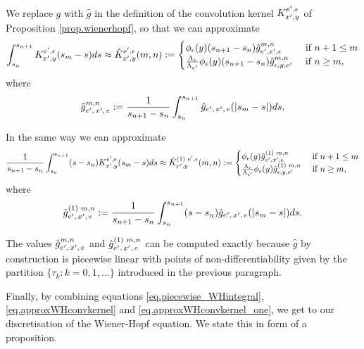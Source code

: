 \documentclass[10pt, article,table]{article}
\begin{document}
We replace $g$ with $\hat{g}$ in the definition of the convolution kernel $K_{x^{\prime},y}^{e^{\prime},\epsilon}$ of Proposition \ref{prop.wienerhopf}, so that we can approximate 
\begin{equation}\label{eq.approxWHconvkernel}
 \int_{s_{n}}^{s_{n+1}} K_{x^{\prime},y}^{e^{\prime},\epsilon} (s_m -s )ds
 \approx
 \hat{K}_{x^{\prime},y}^{e^{\prime},\epsilon}(m,n) 
 :=
 \begin{cases}
  \phi_{\epsilon} (y) (s_{n+1}-s_n) \hat{g}_{e^{\prime},x^{\prime},\epsilon}^{m,n} & \text{ if } n+1\leq m
  \\
  \frac{\Lambda_\epsilon}{\Lambda_{e^{\prime}}} \phi_{\epsilon} (y) (s_{n+1}-s_n) \hat{g}_{\epsilon,y,e^{\prime}}^{m,n} & \text{ if } n\geq m , 
 \end{cases}
\end{equation}
where 
\begin{equation*}
 \hat{g}_{e^{\prime},\, x^{\prime},\, e}^{m,n} := \frac{1}{s_{n+1}-s_{n}}\int_{s_n}^{s_{n+1}} \hat{g}_{e^{\prime},\, x^{\prime},\, e} (\left\lvert {s_m -s} \right\rvert)ds.
\end{equation*}

In the same way we can approximate
\begin{equation}\label{eq.approxWHconvkernel_one}
 \frac{1}{s_{n+1}-s_{n}}\int_{s_{n}}^{s_{n+1}} (s-s_n)K_{x^{\prime},y}^{e^{\prime},\epsilon} (s_m -s )ds
 \approx
 \hat{K}_{x^{\prime},y}^{(1) \, \, e^{\prime},\epsilon}(m,n) 
 :=
 \begin{cases}
  \phi_{\epsilon} (y) \hat{g}_{e^{\prime},x^{\prime},\epsilon}^{(1) \, \, m,n} & \text{ if } n+1\leq m
  \\
  \frac{\Lambda_\epsilon}{\Lambda_{e^{\prime}}} \phi_{\epsilon} (y) \hat{g}_{\epsilon,y,e^{\prime}}^{(1) \, \, m,n} & \text{ if } n\geq m , 
 \end{cases}
\end{equation}
where 
\begin{equation*}
 \hat{g}_{e^{\prime},\, x^{\prime},\, e}^{(1) \, \, m,n} := \frac{1}{s_{n+1}-s_{n}}\int_{s_n}^{s_{n+1}} (s-s_n)\hat{g}_{e^{\prime},\, x^{\prime},\, e} (\left\lvert {s_m -s} \right\rvert)ds.
\end{equation*}

The values $\hat{g}_{e^{\prime},\, x^{\prime},\, e}^{m,n}$ and  $\hat{g}_{e^{\prime},\, x^{\prime},\, e}^{(1) \, \, m,n}$ can be computed exactly because $\hat{g}$ by construction is piecewise linear with points of non-differentiability given by the partition $\lbrace \tau_k : k=0,1,\dots\rbrace$ introduced in the previous paragraph. 

Finally, by combining equations \eqref{eq.piecewise_WHintegral}, \eqref{eq.approxWHconvkernel} and \eqref{eq.approxWHconvkernel_one}, we get to our discretisation of the Wiener-Hopf equation. We state this  in form of a proposition.
\end{document}
